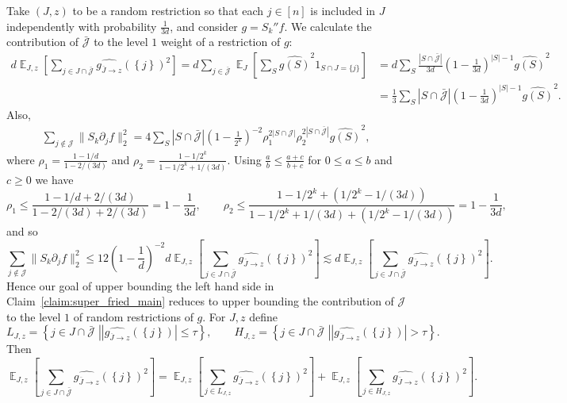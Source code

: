 \documentclass[10pt]{article}
\newcommand{\card}[1]{\left\lvert #1\right\rvert}
\newcommand{\set}[1]{{\left\{#1\right\}}}
\newcommand{\sett}[2]{\left\{\left. #1\;\right\vert #2\right\}}
\newcommand{\Expect}[2]{{\mathop{\mathbb E}_{#1}\left[#2\right]}}
\newcommand{\norm}[1]{\lVert #1\rVert}
\renewcommand{\ll}{\lesssim}
\begin{document}
  Take $(J,z)$ to be a random restriction so that each $j\in [n]$ is included in $J$ independently with probability $\frac{1}{3d}$,
  and consider $g = S_k'' f$.
  We calculate
  the contribution of $\bar{\mathcal{J}}$ to the level $1$ weight of a restriction of $g$:
  \begin{align*}
  d\Expect{J, z}{\sum\limits_{j\in J\cap \bar{\mathcal{J}}}\widehat{g_{\overline{J}\rightarrow z}}(\set{j})^2}
  =d\sum\limits_{j\in \overline{\mathcal{J}}}\Expect{J}{\sum\limits_{S}\widehat{g(S)}^2 1_{S\cap J = \{j\}}}
  &=d\sum\limits_{S}\frac{\card{S\cap \bar{\mathcal{J}}}}{3d}\left(1-\frac{1}{3d}\right)^{\card{S}-1}\widehat{g(S)}^2\\
  &=\frac{1}{3}\sum\limits_{S}\card{S\cap \bar{\mathcal{J}}}\left(1-\frac{1}{3d}\right)^{\card{S}-1}\widehat{g(S)}^2.
  \end{align*}
  Also,
  \begin{align*}
    \sum\limits_{j\not\in \mathcal{J}} \norm{S_k \partial_j f}_2^2
    =
    4\sum\limits_{S}
    \card{S\cap \bar{\mathcal{J}}}
    \left(1-\frac{1}{2^k}\right)^{-2}\rho_1^{2\card{S\cap \mathcal{J}}}
    \rho_2^{2\card{S\cap \bar{\mathcal{J}}}}\widehat{g(S)}^2,
  \end{align*}
  where $\rho_1 = \frac{1-1/d}{1-2/(3d)}$ and $\rho_2 = \frac{1-1/2^k}{1-1/2^k+1/(3d)}$. Using $\frac{a}{b}\leq \frac{a+c}{b+c}$ for $0\leq a\leq b$ and $c\geq 0$ we have
  \[
  \rho_1 \leq \frac{1-1/d+2/(3d)}{1-2/(3d)+2/(3d)} = 1-\frac{1}{3d},
  \qquad
  \rho_2 \leq \frac{1-1/2^k+(1/2^k-1/(3d))}{1-1/2^k+1/(3d)+(1/2^k-1/(3d))} = 1-\frac{1}{3d},
  \]
  and so
  \[
  \sum\limits_{j\not\in \mathcal{J}} \norm{S_k \partial_j f}_2^2\leq
  12\left(1-\frac{1}{d}\right)^{-2} d\Expect{J, z}{\sum\limits_{j\in J\cap \bar{\mathcal{J}}}\widehat{g_{\overline{J}\rightarrow z}}(\set{j})^2}
  \ll d\Expect{J, z}{\sum\limits_{j\in J\cap \bar{\mathcal{J}}}\widehat{g_{\overline{J}\rightarrow z}}(\set{j})^2}.
  \]
  Hence our
  goal of upper bounding the left hand side in Claim~\ref{claim:super_fried_main} reduces to
  upper bounding the contribution of $\mathcal{J}$ to the level $1$ of random restrictions of $g$. For $J, z$ define
 \[
  L_{J,z} = \sett{j\in J\cap \bar{\mathcal{J}}}{\card{\widehat{g_{\overline{J}\rightarrow z}}(\set{j})} \leq \tau},
  \qquad
  H_{J,z} = \sett{j\in J\cap \bar{\mathcal{J}}}{\card{\widehat{g_{\overline{J}\rightarrow z}}(\set{j})} > \tau}.
  \]
  Then
  \[
  \Expect{J, z}{\sum\limits_{j\in J\cap \bar{\mathcal{J}}}\widehat{g_{\overline{J}\rightarrow z}}(\set{j})^2}
  =\Expect{J, z}{\sum\limits_{j\in L_{J,z}}\widehat{g_{\overline{J}\rightarrow z}}(\set{j})^2}
  +\Expect{J, z}{\sum\limits_{j\in H_{J,z}}\widehat{g_{\overline{J}\rightarrow z}}(\set{j})^2}.
  \]
\end{document}
